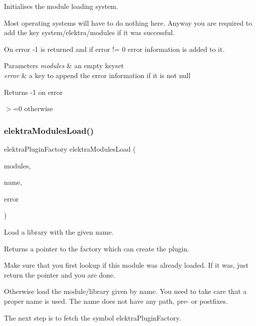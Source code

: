 Initialises the module loading system. 

Most operating systems will have to do nothing here. Anyway you are required to add the key system/elektra/modules if it was successful.

On error -\/1 is returned and if error != 0 error information is added to it.


\begin{DoxyParams}{Parameters}
{\em modules} & an empty keyset \\
\hline
{\em error} & a key to append the error information if it is not null \\
\hline
\end{DoxyParams}
\begin{DoxyReturn}{Returns}
-\/1 on error 

$>$=0 otherwise 
\end{DoxyReturn}
\mbox{\label{group__modules_ga09300fbf0e0cfc9dc80bb877b00117c0}} 
\subsubsection{\texorpdfstring{elektra\+Modules\+Load()}{elektraModulesLoad()}}
{\footnotesize\ttfamily elektra\+Plugin\+Factory elektra\+Modules\+Load (\begin{DoxyParamCaption}\item[{Key\+Set $\ast$}]{modules,  }\item[{const char $\ast$}]{name,  }\item[{Key $\ast$}]{error }\end{DoxyParamCaption})}



Load a library with the given name. 

\begin{DoxyReturn}{Returns}
a pointer to the factory which can create the plugin.
\end{DoxyReturn}
Make sure that you first lookup if this module was already loaded. If it was, just return the pointer and you are done.

Otherwise load the module/library given by name. You need to take care that a proper name is used. The name does not have any path, pre-\/ or postfixes.

The next step is to fetch the symbol elektra\+Plugin\+Factory.

